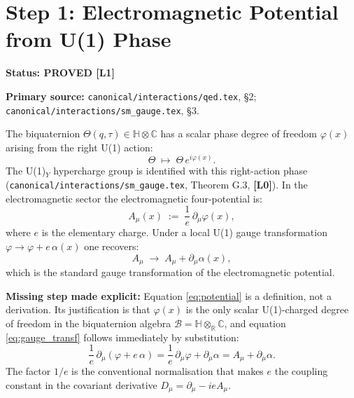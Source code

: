 \documentclass[11pt,a4paper]{article}
\newcommand{\Lzero}{\textbf{[L0]}}
\newcommand{\Lone}{\textbf{[L1]}}
\newcommand{\PROVED}{\textbf{PROVED}}
\begin{document}
\section{Step 1: Electromagnetic Potential from U(1) Phase}

\noindent\textbf{Status: \PROVED{} \Lone}

\noindent\textbf{Primary source:}
\texttt{canonical/interactions/qed.tex}, \S2;
\texttt{canonical/interactions/sm\_gauge.tex}, \S3.

\medskip

The biquaternion $\Theta(q,\tau) \in \mathbb{H}\otimes\mathbb{C}$ has a
scalar phase degree of freedom $\varphi(x)$ arising from the right U(1) action:
\begin{equation}\label{eq:U1action}
  \Theta \;\mapsto\; \Theta\,e^{i\varphi(x)}.
\end{equation}
The U(1)$_Y$ hypercharge group is identified with this right-action phase
(\texttt{canonical/interactions/sm\_gauge.tex}, Theorem G.3, \Lzero).
In the electromagnetic sector the electromagnetic four-potential is:
\begin{equation}\label{eq:potential}
  A_\mu(x) \;:=\; \frac{1}{e}\,\partial_\mu \varphi(x),
\end{equation}
where $e$ is the elementary charge. Under a local U(1) gauge transformation
$\varphi \to \varphi + e\,\alpha(x)$ one recovers:
\begin{equation}\label{eq:gauge_transf}
  A_\mu \;\to\; A_\mu + \partial_\mu \alpha(x),
\end{equation}
which is the standard gauge transformation of the electromagnetic potential.

\medskip
\noindent\textbf{Missing step made explicit:} Equation \eqref{eq:potential}
is a definition, not a derivation. Its justification is that $\varphi(x)$
is the only scalar U(1)-charged degree of freedom in the biquaternion algebra
$\mathcal{B} = \mathbb{H}\otimes_\mathbb{R}\mathbb{C}$, and equation
\eqref{eq:gauge_transf} follows immediately by substitution:
\begin{equation}
  \frac{1}{e}\,\partial_\mu(\varphi + e\,\alpha)
  = \frac{1}{e}\,\partial_\mu\varphi + \partial_\mu\alpha
  = A_\mu + \partial_\mu\alpha.
\end{equation}
The factor $1/e$ is the conventional normalisation that makes $e$ the
coupling constant in the covariant derivative $D_\mu = \partial_\mu - ieA_\mu$.
\end{document}
